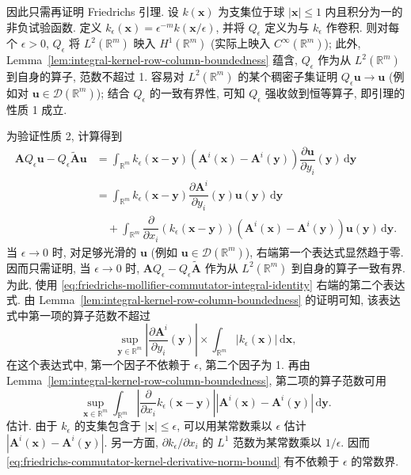 \begin{Proof}
因此只需再证明 Friedrichs 引理. 设 $k(\bm{x})$ 为支集位于球 $|\bm{x}|\leq1$ 内且积分为一的非负试验函数. 定义 $k_\epsilon(\bm{x})=\epsilon^{-m}k(\bm{x}/\epsilon)$, 并将 $Q_\epsilon$ 定义为与 $k_\epsilon$ 作卷积. 则对每个 $\epsilon>0$, $Q_\epsilon$ 将 $L^2(\mathbb{R}^m)$ 映入 $H^1(\mathbb{R}^m)$ (实际上映入 $C^\infty(\mathbb{R}^m)$); 此外, Lemma~\ref{lem:integral-kernel-row-column-boundedness} 蕴含, $Q_\epsilon$ 作为从 $L^2(\mathbb{R}^m)$ 到自身的算子, 范数不超过 1. 容易对 $L^2(\mathbb{R}^m)$ 的某个稠密子集证明 $Q_\epsilon\bm{u}\to\bm{u}$ (例如对 $\bm{u}\in\mathcal{D}(\mathbb{R}^m)$); 结合 $Q_\epsilon$ 的一致有界性, 可知 $Q_\epsilon$ 强收敛到恒等算子, 即引理的性质 1 成立.\par 为验证性质 2, 计算得到
\begin{equation}\label{eq:friedrichs-mollifier-commutator-integral-identity}
\begin{aligned}
\bm{A}Q_\epsilon\bm{u}-Q_\epsilon\widetilde{\bm{A}}\bm{u}&=\int_{\mathbb{R}^m}k_\epsilon(\bm{x}-\bm{y})(\bm{A}^i(\bm{x})-\bm{A}^i(\bm{y}))\dfrac{\partial\bm{u}}{\partial y_i}(\bm{y})\,\mathrm{d}\bm{y}\\
&=\int_{\mathbb{R}^m}k_\epsilon(\bm{x}-\bm{y})\dfrac{\partial\bm{A}^i}{\partial y_i}(\bm{y})\bm{u}(\bm{y})\,\mathrm{d}\bm{y}\\
&\quad+\int_{\mathbb{R}^m}\dfrac{\partial}{\partial x_i}(k_\epsilon(\bm{x}-\bm{y}))(\bm{A}^i(\bm{x})-\bm{A}^i(\bm{y}))\bm{u}(\bm{y})\,\mathrm{d}\bm{y}.
\end{aligned}
\end{equation}
当 $\epsilon\to0$ 时, 对足够光滑的 $\bm{u}$ (例如 $\bm{u}\in\mathcal{D}(\mathbb{R}^m)$), 右端第一个表达式显然趋于零. 因而只需证明, 当 $\epsilon\to0$ 时, $\bm{A}Q_\epsilon-Q_\epsilon\widetilde{\bm{A}}$ 作为从 $L^2(\mathbb{R}^m)$ 到自身的算子一致有界. 为此, 使用 \eqref{eq:friedrichs-mollifier-commutator-integral-identity} 右端的第二个表达式. 由 Lemma~\ref{lem:integral-kernel-row-column-boundedness} 的证明可知, 该表达式中第一项的算子范数不超过
\begin{equation}\label{eq:friedrichs-commutator-coefficient-derivative-norm-bound}
\sup_{\bm{y}\in\mathbb{R}^m}\left|\dfrac{\partial\bm{A}^i}{\partial y_i}(\bm{y})\right|\times\int_{\mathbb{R}^m}|k_\epsilon(\bm{x})|\,\mathrm{d}\bm{x},
\end{equation}
在这个表达式中, 第一个因子不依赖于 $\epsilon$, 第二个因子为 1. 再由 Lemma~\ref{lem:integral-kernel-row-column-boundedness}, 第二项的算子范数可用
\begin{equation}\label{eq:friedrichs-commutator-kernel-derivative-norm-bound}
\sup_{\bm{x}\in\mathbb{R}^m}\int_{\mathbb{R}^m}\left|\dfrac{\partial}{\partial x_i}k_\epsilon(\bm{x}-\bm{y})\right|\left|\bm{A}^i(\bm{x})-\bm{A}^i(\bm{y})\right|\,\mathrm{d}\bm{y}.
\end{equation}
估计. 由于 $k_\epsilon$ 的支集包含于 $|\bm{x}|\leq\epsilon$, 可以用某常数乘以 $\epsilon$ 估计 $|\bm{A}^i(\bm{x})-\bm{A}^i(\bm{y})|$. 另一方面, $\partial k_\epsilon/\partial x_i$ 的 $L^1$ 范数为某常数乘以 $1/\epsilon$. 因而 \eqref{eq:friedrichs-commutator-kernel-derivative-norm-bound} 有不依赖于 $\epsilon$ 的常数界.
\end{Proof}

